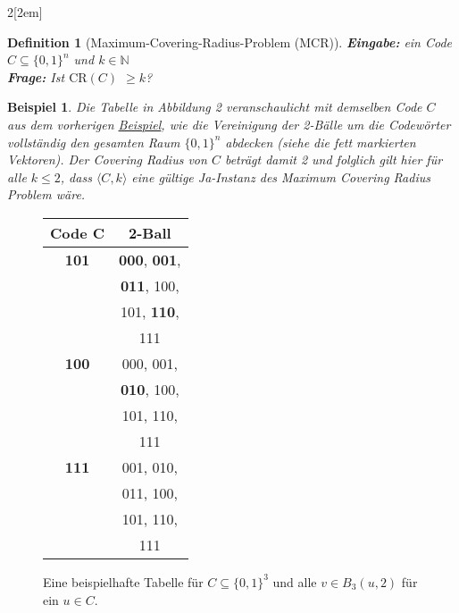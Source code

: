 \documentclass[11pt]{article}
\theoremstyle{break}
\newtheorem{definition}{Definition}
\theoremstyle{norm}
\newtheorem{ex}{Beispiel}
\begin{document}
\begin{multicols}{2}[\columnsep2em]
\begin{definition}[Maximum-Covering-Radius-Problem (MCR)]
\noindent
\textbf{Eingabe:} ein Code $C \subseteq \{0,1\}^n$ und $k \in \mathbb{N}$\\
\textbf{Frage:} Ist $\text{CR}(C)$ $\geq k$?
\end{definition}
\begin{ex}
Die Tabelle in Abbildung 2 veranschaulicht mit demselben Code $C$ aus dem vorherigen \hyperref[beispiel1]{Beispiel}, wie die Vereinigung der 2-Bälle um die Codewörter vollständig den gesamten Raum $\{0,1\}^n$ abdecken (siehe die fett markierten Vektoren). Der Covering Radius von $C$ beträgt damit 2 und folglich gilt hier für alle $k \leq 2$, dass $\langle C,k\rangle$ eine gültige Ja-Instanz des Maximum Covering Radius Problem wäre.
\end{ex}
\columnbreak
   \begin{figure}[H]
    \centering
        \begin{tabular}{|c||c|}
        \hline
            Code C & 2-Ball\\ 
        \hline
             \textbf{101} & \textbf{000}, \textbf{001}, \\ & \textbf{011}, 100, \\ & 101, \textbf{110}, \\ & 111 \\ 

        \hline
             \textbf{100} &  000, 001, \\ & \textbf{010}, 100, \\ & 101, 110, \\ & 111 \\ 
        \hline
             \textbf{111} & 001, 010, \\ & 011, 100, \\ & 101, 110, \\ & 111 \\ 
            \hline
        \end{tabular}
    \caption{Eine beispielhafte Tabelle für $C \subseteq \{0,1\}^3$ und alle $v \in B_3(u,2)$ für ein $u\in C$.}
    \label{fig:enter-label}
\end{figure}
\end{multicols}
\end{document}
